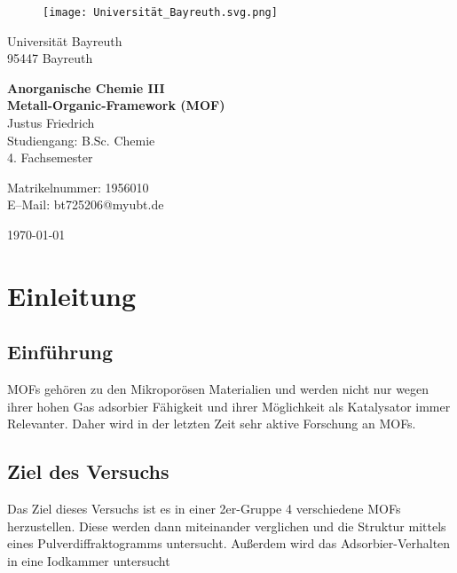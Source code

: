 \documentclass[12pt, a4paper]{article}
\begin{document}
\begin{figure}
    \texttt{[image: Universität\_Bayreuth.svg.png]}
\end{figure}



{\raggedright Universität Bayreuth\\  95447 Bayreuth}


\vspace{5cm}

\begin{center}
{\LARGE\bf{Anorganische Chemie III}} \\  
\vspace{1cm}
{\Large\bf{Metall-Organic-Framework (MOF)}}\\
\vspace{0.5cm}
{\large Justus Friedrich\\}
{Studiengang: B.Sc. Chemie\\}
{4. Fachsemester}
\end{center}





\thispagestyle{empty}
\begin{center}
{\small Matrikelnummer: 1956010 \\
E–Mail:  bt725206@myubt.de}
\end{center}

\vspace{5cm}

\today


\newpage
\tableofcontents
\thispagestyle{empty}


\newpage
\setcounter{page}{1}
\section{Einleitung}



\subsection{Einführung}
{MOFs gehören zu den Mikroporösen Materialien und werden nicht nur wegen ihrer hohen Gas adsorbier Fähigkeit und ihrer Möglichkeit als Katalysator 
immer Relevanter. Daher wird in der letzten Zeit sehr aktive Forschung an MOFs.\cite{ThomasHillman.2018}

}

\subsection{Ziel des Versuchs}
{Das Ziel dieses Versuchs ist es in einer 2er-Gruppe 4 verschiedene MOFs herzustellen. Diese werden dann miteinander verglichen und die Struktur mittels eines 
Pulverdiffraktogramms untersucht. Außerdem wird das Adsorbier-Verhalten in eine Iodkammer untersucht



}
\end{document}

